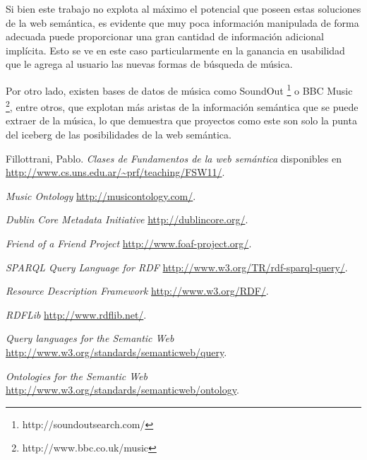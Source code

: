 \documentclass[a4paper,oneside]{report}
\begin{document}
Si bien este trabajo no explota al máximo el potencial que poseen estas soluciones de la web semántica, es evidente que muy poca información manipulada de forma adecuada puede proporcionar una gran cantidad de información adicional implícita. Esto se ve en este caso particularmente en la ganancia en usabilidad que le agrega al usuario las nuevas formas de búsqueda de música.

Por otro lado, existen bases de datos de música como SoundOut \footnote{http://soundoutsearch.com/} o BBC Music \footnote{http://www.bbc.co.uk/music}, entre otros, que explotan más aristas de la información semántica que se puede extraer de la música, lo que demuestra que proyectos como este son solo la punta del iceberg de las posibilidades de la web semántica.

\begin{thebibliography}{9}

 Fillottrani, Pablo. \emph{Clases de Fundamentos de la web semántica}
disponibles en 
\url{http://www.cs.uns.edu.ar/~prf/teaching/FSW11/}.

 \emph{Music Ontology}
\url{http://musicontology.com/}.

 \emph{Dublin Core Metadata Initiative}
\url{http://dublincore.org/}.

 \emph{Friend of a Friend Project}
\url{http://www.foaf-project.org/}.

 \emph{SPARQL Query Language for RDF}
\url{http://www.w3.org/TR/rdf-sparql-query/}.

 \emph{Resource Description Framework}
\url{http://www.w3.org/RDF/}.

 \emph{RDFLib}
\url{http://www.rdflib.net/}.

 \emph{Query languages for the Semantic Web}
\url{http://www.w3.org/standards/semanticweb/query}.

 \emph{Ontologies for the Semantic Web}
\url{http://www.w3.org/standards/semanticweb/ontology}.

\end{thebibliography}

\appendix
\end{document}

